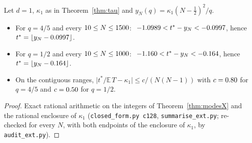 \begin{theorem}\label{thm:1dlawX}
Let $d=1$, $\kappa_1$ as in Theorem~\ref{thm:tau} and $y_N(q)=\kappa_1(N-\frac12)^2/q$.
\begin{itemize}
\item[(a)] For $q=4/5$ and every $10\le N\le1500$\XAlsoOneF: $\ -1.0989<t^*-y_N<-0.0997$, hence $t^*=\lfloor y_N-0.0997\rfloor$.
\item[(b)] For $q=1/2$ and every $10\le N\le1000$\XAlsoOneH: $\ -1.160<t^*-y_N<-0.164$, hence $t^*=\lfloor y_N-0.164\rfloor$.
\item[(c)] On the contiguous ranges, $\bigl|t^*/\mathbb E\,T-\kappa_1\bigr|\le c/(N(N-1))$ with $c=0.80$ for $q=4/5$ and $c=0.50$ for $q=1/2$.
\end{itemize}
\end{theorem}
\begin{proof}
Exact rational arithmetic on the integers of Theorem~\ref{thm:modesX} and the rational enclosure of $\kappa_1$ (\texttt{closed\_form.py c128}, \texttt{summarise\_ext.py}; re-checked for every $N$, with both endpoints of the enclosure of $\kappa_1$, by \texttt{audit\_ext.py}).
\end{proof}
